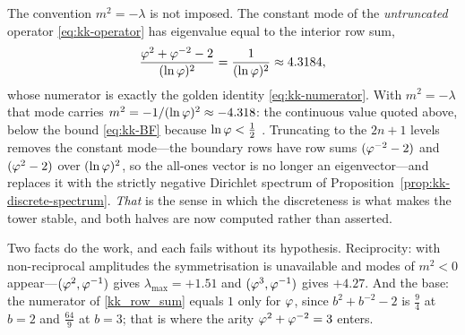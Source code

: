 \begin{remark}\label{rmk:kk-sign}
The convention $m^{2}=-\lambda$ is not imposed. The constant mode of the \emph{untruncated}
operator \eqref{eq:kk-operator} has eigenvalue equal to the interior row sum,
\begin{equation}\label{kk_row_sum}
  \frac{\varphi^{2}+\varphi^{-2}-2}{(\ln\varphi)^{2}}=\frac{1}{(\ln\varphi)^{2}}\approx4.3184 ,
\end{equation}
whose numerator is exactly the golden identity \eqref{eq:kk-numerator}. With $m^{2}=-\lambda$ that
mode carries $m^{2}=-1/(\ln\varphi)^{2}\approx-4.318$: the continuous value quoted above, below the
bound \eqref{eq:kk-BF} because $\ln\varphi<\tfrac12$ .
Truncating to the
$2n+1$ levels removes the constant mode---the boundary rows have row sums
$(\varphi^{-2}-2)$ and $(\varphi^{2}-2)$ over $(\ln\varphi)^{2}$, so the all-ones vector is no
longer an eigenvector---and replaces it with the strictly negative Dirichlet spectrum of
Proposition~\ref{prop:kk-discrete-spectrum}. \emph{That} is the sense in which the discreteness is
what makes the tower stable, and both halves are now computed rather than asserted.

Two facts do the work, and each fails without its hypothesis. Reciprocity: with non-reciprocal
amplitudes the symmetrisation is unavailable and modes of $m^{2}<0$ appear---$(\varphi^{2},\varphi^{-1})$
gives $\lambda_{\max}=+1.51$ and $(\varphi^{3},\varphi^{-1})$ gives $+4.27$. And the base: the
numerator of \eqref{kk_row_sum} equals $1$ only for $\varphi$, since $b^{2}+b^{-2}-2$ is
$\tfrac94$ at $b=2$ and $\tfrac{64}9$ at $b=3$; that is where the arity
$\varphi^{2}+\varphi^{-2}=3$ enters.


\end{remark}

